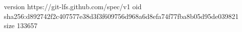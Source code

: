 version https://git-lfs.github.com/spec/v1
oid sha256:d892742f2c407577e38d3f3f609756d968a6d8efa74f77fba8b05d95de039821
size 133657
